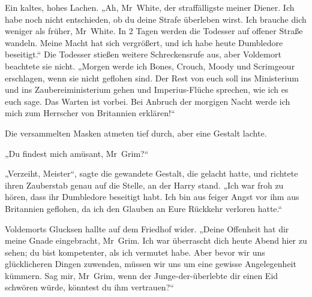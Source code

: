 Ein kaltes, hohes Lachen.
„Ah, Mr~White, der straffälligste meiner Diener. Ich habe noch nicht entschieden, ob du deine Strafe überleben wirst. Ich brauche dich weniger als früher, Mr~White. In 2 Tagen werden die Todesser auf offener Straße wandeln. Meine Macht hat sich vergrößert, und ich habe heute Dumbledore beseitigt.“
Die Todesser stießen weitere Schreckensrufe aus, aber Voldemort beachtete sie nicht.
„Morgen werde ich Bones, Crouch, Moody und Scrimgeour erschlagen, wenn sie nicht geflohen sind. Der Rest von euch soll ins Ministerium und ins Zaubereiministerium gehen und Imperius-Flüche sprechen, wie ich es euch sage. Das Warten ist vorbei. Bei Anbruch der morgigen Nacht werde ich mich zum Herrscher von Britannien erklären!“

Die versammelten Masken atmeten tief durch, aber eine Gestalt lachte.

„Du findest mich amüsant, Mr~Grim?“

„Verzeiht, Meister“, sagte die gewandete Gestalt, die gelacht hatte, und richtete ihren Zauberstab genau auf die Stelle, an der Harry stand.
„Ich war froh zu hören, dass ihr Dumbledore beseitigt habt. Ich bin aus feiger Angst vor ihm aus Britannien geflohen, da ich den Glauben an Eure Rückkehr verloren hatte.“

Voldemorts Glucksen hallte auf dem Friedhof wider.
„Deine Offenheit hat dir meine Gnade eingebracht, Mr~Grim. Ich war überrascht dich heute Abend hier zu sehen; du bist kompetenter, als ich vermutet habe. Aber bevor wir uns glücklicheren Dingen zuwenden, müssen wir uns um eine gewisse Angelegenheit kümmern. Sag mir, Mr~Grim, wenn der Junge-der-überlebte dir einen Eid schwören würde, könntest du ihm vertrauen?“

